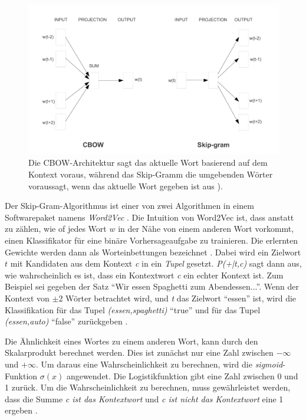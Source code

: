 \begin{figure}[H]
    \centering
    \includegraphics[width=12cm]{kapitel3/cbowskipgr.png}
    \caption[Vergleich zwischen CBOW und Skip-Gram Architektur]{Die CBOW-Architektur sagt das aktuelle Wort basierend auf dem Kontext voraus, während das Skip-Gramm die umgebenden Wörter voraussagt, wenn das aktuelle Wort gegeben ist aus \cite*{Mikolov}).}
    \label{cbowskipgr}
\end{figure}

Der Skip-Gram-Algorithmus ist einer von zwei Algorithmen in einem Softwarepaket namens \textit{Word2Vec} \cite*{Mikolov2013}\cite*{Mikolov}. Die Intuition von Word2Vec ist, dass anstatt zu zählen, wie of jedes Wort $w$ in der Nähe von einem anderen Wort vorkommt, einen Klassifikator für eine binäre Vorhersageaufgabe zu trainieren. Die erlernten Gewichte werden dann als Worteinbettungen bezeichnet \cite*[111]{Jurafskya}. Dabei wird ein Zielwort $t$ mit Kandidaten aus dem Kontext \textit{c} in ein \textit{Tupel} gesetzt. \textit{P(+|t,c)} sagt dann aus, wie wahrscheinlich es ist, dass ein Kontextwort \textit{c} ein echter Kontext ist. Zum Beispiel sei gegeben der Satz \enquote{Wir essen Spaghetti zum Abendessen...}. Wenn der Kontext von $\pm 2$ Wörter betrachtet wird, und \textit{t} das Zielwort \enquote{essen} ist, wird die Klassifikation für das Tupel \textit{(essen,spaghetti)} \enquote{true} und für das Tupel \textit{(essen,auto)} \enquote{false} zurückgeben \cite*[111]{Jurafskya}.


Die Ähnlichkeit eines Wortes zu einem anderen Wort, kann durch den Skalarprodukt berechnet werden. Dies ist zunächst nur eine Zahl zwischen $-\infty$ und $+\infty$. Um daraus eine Wahrscheinlichkeit zu berechnen, wird die \textit{sigmoid}-Funktion $\sigma(x)$ angewendet. Die Logistikfunktion gibt eine Zahl zwischen 0 und 1 zurück. Um die Wahrscheinlichkeit zu berechnen, muss gewährleistet werden, dass die Summe \textit{c ist das Kontextwort} und \textit{c ist nicht das Kontextwort} eine 1 ergeben \cite*[112]{Jurafskya}.

